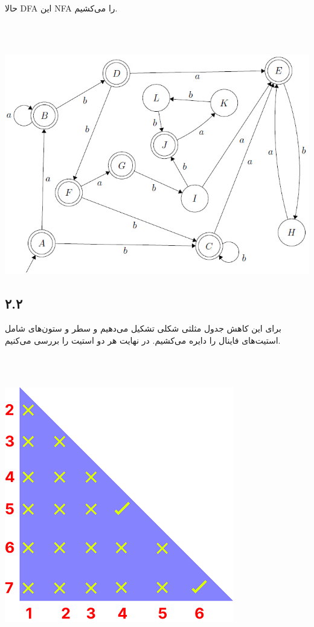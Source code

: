 حالا DFA این NFA را می‌کشیم.

\\
\\
\begin{center}
	\includegraphics{DFA5}
\end{center}

\subsection*{۲.۲}

برای این کاهش جدول مثلثی شکلی تشکیل می‌دهیم و سطر و ستون‌های شامل استیت‌های فاینال را دایره می‌کشیم. در نهایت هر دو استیت را بررسی می‌کنیم. 

\\
\\
\begin{center}
	\includegraphics{list}
\end{center}

